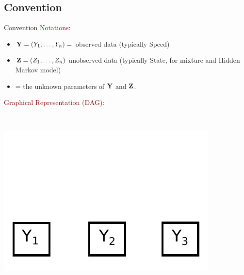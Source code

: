 \documentclass{beamer}\usepackage[]{graphicx}\usepackage[]{color}
\newcommand{\emphase}[1]{\textcolor{darkred}{#1}}
\newcommand{\paragraph}[1]{\emphase{#1}}
\newcommand{\Ybf}{{\bf Y}}
\newcommand{\Zbf}{{\bf Z}}
\newcommand{\thetabf}{\mbox{\mathversion{bold}{$\theta$}}}
\begin{document}
\subsection*{Convention}


\begin{frame}{Convention}
\paragraph{Notations:}
{\small
\begin{itemize}
\item $\Ybf = (Y_1, \ldots, Y_n) = $ observed data (typically Speed)
 \item $\Zbf= (Z_1, \ldots, Z_n) $ unobserved data (typically State, for mixture  and Hidden Markov model)
 \item \thetabf = the unknown parameters of $\Ybf$ and $\Zbf$.
\end{itemize}
}
\pause
\paragraph{Graphical Representation (DAG):}  \medskip
\begin{columns}
\begin{column}{0.3\textwidth}
\\ \smallskip
\includegraphics[scale=0.4]{Dag1.pdf}
\end{column}
\pause



\end{columns}
\end{frame}
\end{document}
